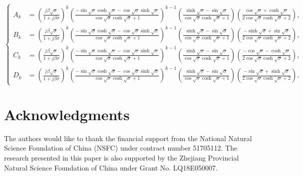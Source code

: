 \documentclass{article}
\begin{document}
\begin{equation*}
    \left\{\begin{aligned}
        A_{k} &= \left( \frac{j \beta \sqrt{\sigma }}{1+j \beta \sigma } \right)^{k} \left( \frac{ -\sin\sqrt{\sigma} \cosh\sqrt{\sigma} - \cos\sqrt{\sigma} \sinh\sqrt{\sigma} }{ \cos\sqrt{\sigma }\cosh\sqrt{\sigma }+1 } \right)^{k-1} \left( \frac{\sinh\sqrt{\sigma }-\sin\sqrt{\sigma }}{\cos\sqrt{\sigma } \cosh\sqrt{\sigma }+1} \right) \left(\frac{\cos\sqrt{\sigma }+\cosh\sqrt{\sigma }}{2 \cos\sqrt{\sigma }\cosh\sqrt{\sigma }+2} \right), \\
        B_{k} &= \left( \frac{j \beta \sqrt{\sigma }}{1+j \beta \sigma } \right)^{k}  \left( \frac{ -\sin\sqrt{\sigma} \cosh\sqrt{\sigma} - \cos\sqrt{\sigma} \sinh\sqrt{\sigma} }{ \cos\sqrt{\sigma }\cosh\sqrt{\sigma }+1 } \right)^{k-1} \left( \frac{\sinh\sqrt{\sigma }-\sin\sqrt{\sigma }}{\cos\sqrt{\sigma } \cosh\sqrt{\sigma }+1} \right) \left( \frac{-\sinh\sqrt{\sigma }+\sin\sqrt{\sigma }}{2 \cos\sqrt{\sigma }\cosh\sqrt{\sigma }+2} \right), \\
        C_{k} &= \left( \frac{j \beta \sqrt{\sigma }}{1+j \beta \sigma } \right)^{k}  \left( \frac{ -\sin\sqrt{\sigma} \cosh\sqrt{\sigma} - \cos\sqrt{\sigma} \sinh\sqrt{\sigma} }{ \cos\sqrt{\sigma }\cosh\sqrt{\sigma }+1 } \right)^{k-1} \left( \frac{\sinh\sqrt{\sigma }-\sin\sqrt{\sigma }}{\cos\sqrt{\sigma } \cosh\sqrt{\sigma }+1} \right) \left( \frac{-\cos\sqrt{\sigma }-\cosh\sqrt{\sigma }}{2 \cos\sqrt{\sigma } \cosh\sqrt{\sigma }+2} \right), \\
        D_{k} &= \left( \frac{j \beta \sqrt{\sigma }}{1+j \beta \sigma } \right)^{k} \left( \frac{ -\sin\sqrt{\sigma} \cosh\sqrt{\sigma} - \cos\sqrt{\sigma} \sinh\sqrt{\sigma} }{ \cos\sqrt{\sigma }\cosh\sqrt{\sigma }+1 } \right)^{k-1} \left( \frac{\sinh\sqrt{\sigma }-\sin\sqrt{\sigma }}{\cos\sqrt{\sigma } \cosh\sqrt{\sigma }+1} \right) \left( \frac{-\sin\sqrt{\sigma }+\sinh\sqrt{\sigma }}{2 \cos\sqrt{\sigma }\cosh\sqrt{\sigma }+2} \right).
    \end{aligned}\right.
\end{equation*}
\normalsize



\section*{Acknowledgments}
The authors would like to thank the financial support from the National Natural Science Foundation of China (NSFC) under contract number 51705112. The research presented in this paper is also supported by the Zhejiang Provincial Natural Science Foundation of China under Grant No. LQ18E050007.



\end{document}

